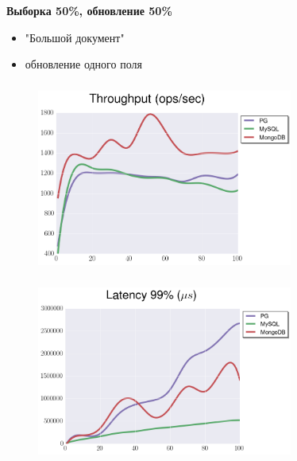 \documentclass[usenames,dvipsnames, 18pt, compress, aspectratio=169]{beamer}
\begin{document}
\begin{frame}
    \frametitle{}
    \begin{center}
        \textbf{Выборка 50\%, обновление 50\%}
        \begin{itemize}[label={}]
            \item "Большой документ"
            \item обновление одного поля
        \end{itemize}
    \end{center}
\end{frame}

\begin{frame}
    \frametitle{}
    \begin{center}
    \begin{figure}
        \includegraphics[width=0.75\textwidth,center]{benchmarks/update_btree_large_throughput.png}
    \end{figure}
    \end{center}
\end{frame}

\begin{frame}
    \frametitle{}
    \begin{center}
    \begin{figure}
        \includegraphics[width=0.75\textwidth,center]{benchmarks/update_btree_large_latency.png}
    \end{figure}
    \end{center}
\end{frame}
\end{document}
